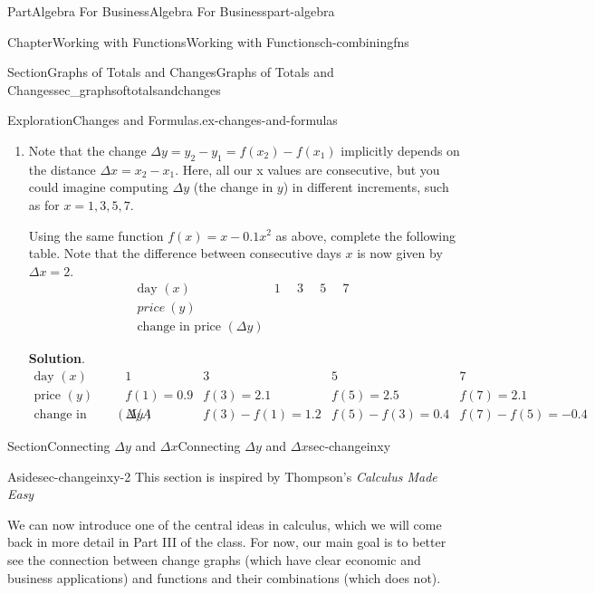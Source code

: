 \documentclass{tufte-book}
\newcommand{\blocktitlefont}{\relax}
\numberwithin{equation}{chapter}
\begin{document}
\begin{partptx}{Part}{Algebra For Business}{}{Algebra For Business}{}{}{part-algebra}
\begin{chapterptx}{Chapter}{Working with Functions}{}{Working with Functions}{}{}{ch-combiningfns}
\begin{sectionptx}{Section}{\textasteriskcentered{}Graphs of Totals and Changes}{}{\textasteriskcentered{}Graphs of Totals and Changes}{}{}{sec_graphsoftotalsandchanges}
\begin{exploration}{Exploration}{Changes and Formulas.}{ex-changes-and-formulas}
\begin{enumerate}[font=\bfseries,label=(\alph*),ref=\alph*]
\item{}Note that the change \(\Delta y = y_2 - y_1 = f(x_2) - f(x_1)\) implicitly depends on the distance \(\Delta x=x_2-x_1\). Here, all our x values are consecutive, but you could imagine computing \(\Delta y\) (the change in \(y\)) in different increments, such as for \(x=1,3,5,7\).%
\par
Using the same function \(f(x) = x-0.1x^{2}\) as above, complete the following table. Note that the difference between consecutive days \(x\) is now given by \(\Delta x = 2\).%
\begin{equation*}
\begin{array}{c|c|c|c|c}
\text{day }(x)
&  1 
&  3  
&  5 
&  7  
\\ \hline
price\ (y)
&  \quad
&  \quad
&  \quad
&  \quad
\\ \hline
\text{change in price }(\Delta y) 
&  
&  
&  
& 
\end{array}
\end{equation*}
%
\par\smallskip%
\noindent\textbf{\blocktitlefont Solution}.\hypertarget{ex-changes-and-formulas-4-2}{}\quad{}%
\begin{equation*}
\begin{array}{c|c|c|c|c|c|c|c}
\text{day }(x)
&  1 
&  3  
&  5 
&  7  
\\ \hline
\text{price }(y) 
&  f(1) = 0.9
&  f(3) = 2.1
&  f(5) = 2.5
&  f(7) = 2.1
\\ \hline
\text{change in price }(\Delta y) 
& N/A  
& f(3) - f(1) = 1.2
& f(5) - f(3) = 0.4
& f(7) - f(5) = -0.4
\end{array}
\end{equation*}
%
\end{enumerate}%
\end{exploration}%
\end{sectionptx}
%
%
\typeout{************************************************}
\typeout{************************************************}
%
\begin{sectionptx}{Section}{\textasteriskcentered{}Connecting \(\Delta y\) and \(\Delta x\)}{}{\textasteriskcentered{}Connecting \(\Delta y\) and \(\Delta x\)}{}{}{sec-changeinxy}
\begin{aside}{Aside}{}{sec-changeinxy-2}%
This section is inspired by Thompson's \emph{Calculus Made Easy}%
\end{aside}
We can now introduce one of the central ideas in calculus, which we will come back in more detail in Part III of the class. For now, our main goal is to better see the connection between change graphs (which have clear economic and business applications) and functions and their combinations (which does not).%

\end{sectionptx}
\end{chapterptx}
\end{partptx}
\end{document}
